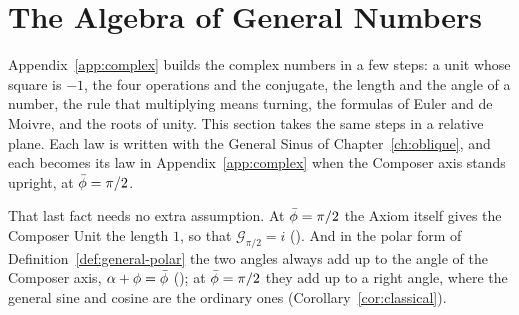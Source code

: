 %
\providecommand{\Jp}{\mathcal{J}_{\bar{\phi}}}                      %
\providecommand{\Ht}{\operatorname{Ht}}                              %
\providecommand{\incomplex}{\par\smallskip\noindent\textsc{In the complex plane.}\enspace}
\makeatletter
\providecommand{\gnkeep}[1]{\par\penalty\z@\begingroup\dimen@=\pagegoal\advance\dimen@-\pagetotal
  \ifdim\pagetotal>\z@\ifdim\dimen@<#1\baselineskip\newpage\fi\fi\endgroup}
\makeatother

\section{The Algebra of General Numbers}\label{sec:gn-algebra}

Appendix~\ref{app:complex} builds the complex numbers in a few steps: a unit whose square is $-1$, the four operations and the conjugate, the length and the angle of a number, the rule that multiplying means turning, the formulas of Euler and de Moivre, and the roots of unity. This section takes the same steps in a relative plane. Each law is written with the General Sinus of Chapter~\ref{ch:oblique}, and each becomes its law in Appendix~\ref{app:complex} when the Composer axis stands upright, at $\bar{\phi} = \pi/2$.

That last fact needs no extra assumption. At $\bar{\phi} = \pi/2$ the Axiom itself gives the Composer Unit the length $1$, so that $\mathcal{G}_{\pi/2} = i$ (). And in the polar form of Definition~\ref{def:general-polar} the two angles always add up to the angle of the Composer axis, $\alpha + \phi = \bar{\phi}$ (); at $\bar{\phi} = \pi/2$ they add up to a right angle, where the general sine and cosine are the ordinary ones (Corollary~\ref{cor:classical}).

